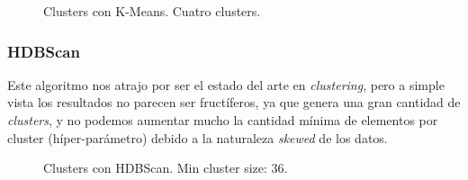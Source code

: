 \documentclass[a4paper]{article}
\begin{document}
\begin{figure}[!h]
	\caption{Clusters con K-Means. Cuatro clusters.}
	\label{fig:mesdiasnormalizado}
\end{figure}


\subsubsection{HDBScan}

Este algoritmo nos atrajo por ser el estado del arte en \textit{clustering}, pero a simple vista los resultados no parecen ser fructíferos, ya que genera una gran cantidad de \textit{clusters}, y no podemos aumentar mucho la cantidad mínima de elementos por cluster (híper-parámetro) debido a la naturaleza \textit{skewed} de los datos.

\begin{figure}[!h]
	\caption{Clusters con HDBScan. Min cluster size: 36.}
	\label{fig:mesdiasnormalizado}
\end{figure}
\end{document}
